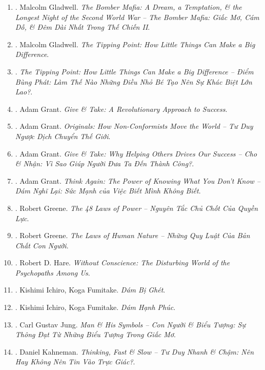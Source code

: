 \documentclass{article}
\begin{document}
\begin{enumerate}
	\item \cite{Gladwell_bomber_mafia}. Malcolm Gladwell. \textit{The Bomber Mafia: A Dream, a Temptation, \& the Longest Night of the Second World War -- The Bomber Mafia: Giấc Mơ, Cám Dỗ, \& Đêm Dài Nhất Trong Thế Chiến II}.\hfill{\sf[done]}
	\item \cite{Gladwell2022}. Malcolm Gladwell. \textit{The Tipping Point: How Little Things Can Make a Big Difference}.\hfill{\sf[reading]}
	\item \cite{Gladwell_tipping_point}. \textit{The Tipping Point: How Little Things Can Make a Big Difference -- Điểm Bùng Phát: Làm Thế Nào Những Điều Nhỏ Bé Tạo Nên Sự Khác Biệt Lớn Lao?}.\hfill{\sf[done]}
	\item \cite{Grant2013}. Adam Grant. \textit{Give \& Take: A Revolutionary Approach to Success}.\hfill{\sf[reading]}
	\item \cite{Grant2020}. Adam Grant. \textit{Originals: How Non-Conformists Move the World -- Tư Duy Ngược Dịch Chuyển Thế Giới}.\hfill{\sf[done]}
	\item \cite{Grant2022a}. Adam Grant. \textit{Give \& Take: Why Helping Others Drives Our Success -- Cho \& Nhận: Vì Sao Giúp Người Đưa Ta Đến Thành Công?}.\hfill{\sf[done]}
	\item \cite{Grant2022b}. Adam Grant. \textit{Think Again: The Power of Knowing What You Don't Know -- Dám Nghĩ Lại: Sức Mạnh của Việc Biết Mình Không Biết}.\hfill{\sf[done]}
	\item \cite{Greene_laws_power}. Robert Greene. \textit{The 48 Laws of Power -- Nguyên Tắc Chủ Chốt Của Quyền Lực}.\hfill{\sf[done]}
	\item \cite{Greene_laws_human_nature}. Robert Greene. \textit{The Laws of Human Nature -- Những Quy Luật Của Bản Chất Con Người}.\hfill{\sf[done]}
	\item \cite{Hare1999}. Robert D. Hare. \textit{Without Conscience: The Disturbing World of the Psychopaths Among Us}.\hfill{\sf[reading]}
	\item \cite{Ichiro_Fumitake2022a}. Kishimi Ichiro, Koga Fumitake. \textit{Dám Bị Ghét}.\hfill{\sf[done]}
	\item \cite{Ichiro_Fumitake2022b}. Kishimi Ichiro, Koga Fumitake. \textit{Dám Hạnh Phúc}.\hfill{\sf[done]}
	\item \cite{Jung2022}. Carl Gustav Jung. \textit{Man \& His Symbols -- Con Người \& Biểu Tượng: Sự Thông Đạt Từ Những Biểu Tượng Trong Giấc Mơ}.\hfill{\sf[done]}
	\item \cite{Kahneman2022}. Daniel Kahneman. \textit{Thinking, Fast \& Slow -- Tư Duy Nhanh \& Chậm: Nên Hay Không Nên Tin Vào Trực Giác?}.\\\mbox{}\hfill{\sf[done]}

\end{enumerate}
\end{document}
